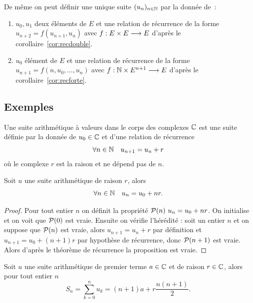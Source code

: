 De même on peut définir une unique suite \((u_n)_{n\in\N}\) par la donnée de~:
\begin{enumerate}
  \item \(u_0, u_1\) deux éléments de \(E\) et une relation de récurrence de la 
    forme \(u_{n + 2} = f(u_{n + 1},u_{n})\) avec \(\fonctionR{f}{E\times 
    E}{E}\) d'après le corollaire~\ref{cor:recdouble}.
  \item \(u_0\) élément de \(E\) et une relation de récurrence de la forme 
    \(u_{n + 1} = f(n, u_{0},\ldots, u_{n})\) avec \(\fonctionR{f}{\N\times E^{n 
    + 1}}{E}\) d'après le corollaire~\ref{cor:recforte}.
\end{enumerate}

\subsection{Exemples}
\begin{defdef}
  Une suite arithmétique à valeurs dans le corps des complexes \(\C\) est une 
  suite définie par la donnée de \(u_0\in\C\) et d'une relation de récurrence 
  \begin{equation}
    \forall n \in \N \quad u_{n + 1} = u_n + r
  \end{equation}
  où le complexe \(r\) est la raison et ne dépend pas de \(n\).
\end{defdef}

\begin{prop}
  Soit \(u\) une suite arithmétique de raison \(r\), alors
  \begin{equation}
    \forall n \in \N \quad u_n = u_0 + nr.
  \end{equation}
\end{prop}

\begin{proof}
  Pour tout entier \(n\) on définit la propriété \(\P(n) \ u_n = u_0 + nr\). On 
  initialise et on voit que \(\P(0)\) est vraie. Ensuite on vérifie l'hérédité : 
  soit un entier \(n\) et on suppose que \(\P(n)\) est vraie, alors \(u_{n + 1} 
  = u_n + r\) par définition et \(u_{n + 1} = u_0 + (n + 1)r\) par hypothèse de 
  récurrence, donc \(\P(n + 1)\) est vraie. Alors d'après le théorème de 
  récurrence la proposition est vraie.
\end{proof}

\begin{prop}
  Soit \(u\) une suite arithmétique de premier terme \(a\in\C\) et de raison 
  \(r\in\C\), alors pour tout entier \(n\)
  \begin{equation}
    S_n = \sum_{k = 0}^n u_k = (n + 1)a + r\frac{n(n + 1)}{2}.
  \end{equation}
\end{prop}

